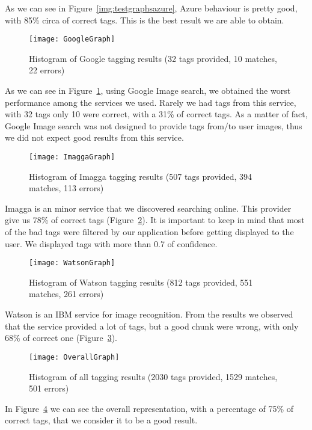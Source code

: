As we can see in Figure~\ref{img:testgraphsazure}, Azure behaviour is pretty good, with 85\% circa of correct tags. This is the best result we are able to obtain.

\begin{figure}[H]
\centering
\texttt{[image: GoogleGraph]}
\caption{Histogram of Google tagging results (32 tags provided, 10 matches, 22 errors)}
\label{img:testgraphgoogle}
\end{figure}

As we can see in Figure~\ref{img:testgraphgoogle}, using Google Image search, we obtained the worst performance among the services we used. Rarely we had tags from this service, with 32 tags only 10 were correct, with a 31\% of correct tags. As a matter of fact, Google Image search was not designed to provide tags from/to user images, thus we did not expect good results from this service.

\begin{figure}[H]
\centering
\texttt{[image: ImaggaGraph]}
\caption{Histogram of Imagga tagging results (507 tags provided, 394 matches, 113 errors)}
\label{img:testgraphimagga}
\end{figure}

Imagga is an minor service that we discovered searching online. This provider give us 78\% of correct tags (Figure~\ref{img:testgraphimagga}). It is important to keep in mind that most of the bad tags were filtered by our application before getting displayed to the user. We displayed tags with more than 0.7 of confidence.

\begin{figure}[H]
\centering
\texttt{[image: WatsonGraph]}
\caption{Histogram of Watson tagging results (812 tags provided, 551 matches, 261 errors)}
\label{img:testgraphwatson}
\end{figure}

Watson is an IBM service for image recognition. From the results we observed that the service provided a lot of tags, but a good chunk were wrong, with only 68\% of correct one (Figure~\ref{img:testgraphwatson}).

\begin{figure}[H]
\centering
\texttt{[image: OverallGraph]}
\caption{Histogram of all tagging results (2030 tags provided, 1529 matches, 501 errors)}
\label{img:testgraphoverall}
\end{figure}

In Figure~\ref{img:testgraphoverall} we can see the overall representation, with a percentage of 75\% of correct tags, that we consider it to be a good result.

